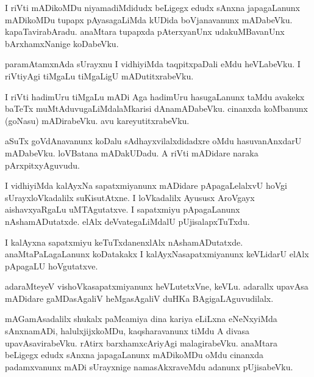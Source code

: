 \documentclass{article}
\begin{document}
\begin{mn}
I  riVti  mADikoMDu  niyamadiMdidudx  beLigegx  edudx  sAnxna  japagaLanunx  mADikoMDu  tupapx  
pAyasagaLiMda  kUDida  boVjanavanunx  mADabeVku.  kapaTavirabAradu.  anaMtara  tupapxda 
pAterxyanUnx  udakuMBavanUnx  bArxhamxNanige  koDabeVku.  
\end{mn}

\begin{mn}
paramAtamxnAda  sUrayxnu  I  vidhiyiMda  taqpitxpaDali  eMdu  heVLabeVku.  I  riVtiyAgi  
tiMgaLu tiMgaLigU  mADutitxrabeVku.
\end{mn}

\begin{mn}
I  riVti  hadimUru  tiMgaLu  mADi  Aga  hadimUru  hasugaLanunx  taMdu  avakekx  baTeTx  
muMtAduvugaLiMdalaMkarisi  dAnamADabeVku.  cinanxda  koMbanunx (goNasu) mADirabeVku.  avu  kareyutitxrabeVku.
\end{mn}

\begin{mn}
aSuTx  goVdAnavanunx  koDalu  sAdhayxvilalxdidadxre  oMdu  hasuvanAnxdarU  mADabeVku.  
loVBatana  mADakUDadu.  A riVti  mADidare  naraka  pArxpitxyAguvudu.
\end{mn}

\begin{mn}
I  vidhiyiMda  kalAyxNa sapatxmiyanunx  mADidare  pApagaLelalxvU  hoVgi  sUrayxloVkadalilx  
suKisutAtxne.  I  loVkadalilx  Ayususx  AroVgayx  aishavxyaRgaLu  uMTAgutatxve.  I  sapatxmiyu  
pApagaLanunx  nAshamADutatxde.  elAlx  deVvategaLiMdalU  pUjisalapxTuTxdu.
\end{mn}

\begin{mn}
I  kalAyxna  sapatxmiyu  keTuTxdanenxlAlx  nAshamADutatxde.  anaMtaPaLagaLanunx  koDatakakx  
I  kalAyxNasapatxmiyanunx  keVLidarU  elAlx  pApagaLU  hoVgutatxve.
\end{mn}

\begin{mn}
adaraMteyeV  vishoVkasapatxmiyanunx  heVLutetxVne,  keVLu.  adarallx  upavAsa mADidare  
gaMDasAgaliV  heMgasAgaliV  duHKa BAgigaLAguvudilalx.
\end{mn}

\begin{mn}
mAGamAsadalilx  shukalx  paMcamiya  dina  kariya  eLiLxna  eNeNxyiMda  sAnxnamADi,  
halulxjijxkoMDu,  kaqsharavanunx  tiMdu  A  divasa upavAsavirabeVku.  rAtirx  
barxhamxcAriyAgi  malagirabeVku.  anaMtara  beLigegx  edudx  sAnxna  japagaLanunx  
mADikoMDu  oMdu  cinanxda  padamxvanunx  mADi  sUrayxnige  namasAkxraveMdu  adanunx  pUjisabeVku.
\end{mn}
\end{document}
